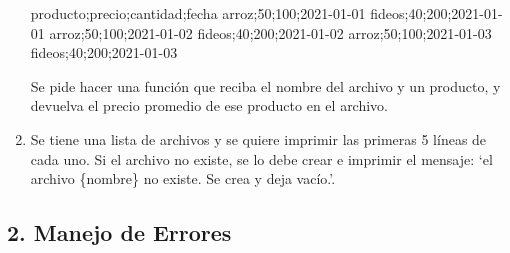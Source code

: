 \documentclass[
  letterpaper,
  DIV=11,
  numbers=noendperiod]{scrreprt}
\newenvironment{Shaded}{\begin{snugshade}}{\end{snugshade}}
\newcommand{\ExtensionTok}[1]{\textcolor[rgb]{0.00,0.23,0.31}{#1}}
\newcommand{\KeywordTok}[1]{\textcolor[rgb]{0.00,0.23,0.31}{#1}}
\begin{document}
\begin{enumerate}
\begin{Shaded}
\begin{Highlighting}[]
\ExtensionTok{producto}\KeywordTok{;}\ExtensionTok{precio}\KeywordTok{;}\ExtensionTok{cantidad}\KeywordTok{;}\ExtensionTok{fecha}
\ExtensionTok{arroz}\KeywordTok{;}\ExtensionTok{50}\KeywordTok{;}\ExtensionTok{100}\KeywordTok{;}\ExtensionTok{2021{-}01{-}01}
\ExtensionTok{fideos}\KeywordTok{;}\ExtensionTok{40}\KeywordTok{;}\ExtensionTok{200}\KeywordTok{;}\ExtensionTok{2021{-}01{-}01}
\ExtensionTok{arroz}\KeywordTok{;}\ExtensionTok{50}\KeywordTok{;}\ExtensionTok{100}\KeywordTok{;}\ExtensionTok{2021{-}01{-}02}
\ExtensionTok{fideos}\KeywordTok{;}\ExtensionTok{40}\KeywordTok{;}\ExtensionTok{200}\KeywordTok{;}\ExtensionTok{2021{-}01{-}02}
\ExtensionTok{arroz}\KeywordTok{;}\ExtensionTok{50}\KeywordTok{;}\ExtensionTok{100}\KeywordTok{;}\ExtensionTok{2021{-}01{-}03}
\ExtensionTok{fideos}\KeywordTok{;}\ExtensionTok{40}\KeywordTok{;}\ExtensionTok{200}\KeywordTok{;}\ExtensionTok{2021{-}01{-}03}
\end{Highlighting}
\end{Shaded}

  Se pide hacer una función que reciba el nombre del archivo y un
  producto, y devuelva el precio promedio de ese producto en el archivo.
\item
  Se tiene una lista de archivos y se quiere imprimir las primeras 5
  líneas de cada uno. Si el archivo no existe, se lo debe crear e
  imprimir el mensaje: `el archivo \{nombre\} no existe. Se crea y deja
  vacío.'.
\end{enumerate}

\subsection*{2. Manejo de Errores}\label{manejo-de-errores-1}
\end{document}
